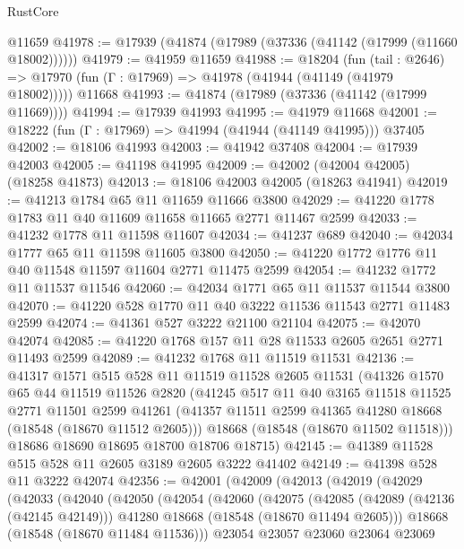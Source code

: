 \begin{lexlean}{RustCore}
\begin{coremodule}
    @11659
@41978 := @17939 (@41874 (@17989 (@37336 (@41142 (@17999 (@11660 @18002))))))
@41979 := @41959 @11659
@41988 := @18204
    (fun (tail : @2646) => @17970 (fun (Γ : @17969) => @41978 (@41944 (@41149 (@41979 @18002)))))
    @11668
@41993 := @41874 (@17989 (@37336 (@41142 (@17999 @11669))))
@41994 := @17939 @41993
@41995 := @41979 @11668
@42001 := @18222 (fun (Γ : @17969) => @41994 (@41944 (@41149 @41995))) @37405
@42002 := @18106 @41993
@42003 := @41942 @37408
@42004 := @17939 @42003
@42005 := @41198 @41995
@42009 := @42002 (@42004 @42005) (@18258 @41873)
@42013 := @18106 @42003 @42005 (@18263 @41941)
@42019 := @41213 @1784 @65 @11 @11659 @11666 @3800
@42029 := @41220 @1778 @1783 @11 @40 @11609 @11658 @11665 @2771 @11467 @2599
@42033 := @41232 @1778 @11 @11598 @11607
@42034 := @41237 @689
@42040 := @42034 @1777 @65 @11 @11598 @11605 @3800
@42050 := @41220 @1772 @1776 @11 @40 @11548 @11597 @11604 @2771 @11475 @2599
@42054 := @41232 @1772 @11 @11537 @11546
@42060 := @42034 @1771 @65 @11 @11537 @11544 @3800
@42070 := @41220 @528 @1770 @11 @40 @3222 @11536 @11543 @2771 @11483 @2599
@42074 := @41361 @527 @3222 @21100 @21104
@42075 := @42070 @42074
@42085 := @41220 @1768 @157 @11 @28 @11533 @2605 @2651 @2771 @11493 @2599
@42089 := @41232 @1768 @11 @11519 @11531
@42136 := @41317
    @1571
    @515
    @528
    @11
    @11519
    @11528
    @2605
    @11531
    (@41326
      @1570
      @65
      @44
      @11519
      @11526
      @2820
      (@41245
        @517
        @11
        @40
        @3165
        @11518
        @11525
        @2771
        @11501
        @2599
        @41261
        (@41357 @11511 @2599 @41365 @41280 @18668 (@18548 (@18670 @11512 @2605)))
        @18668
        (@18548 (@18670 @11502 @11518)))
      @18686
      @18690
      @18695
      @18700
      @18706
      @18715)
@42145 := @41389 @11528 @515 @528 @11 @2605 @3189 @2605 @3222 @41402
@42149 := @41398 @528 @11 @3222 @42074
@42356 := @42001
    (@42009
      (@42013
        (@42019
          (@42029
            (@42033
              (@42040
                (@42050
                  (@42054
                    (@42060
                      (@42075
                        (@42085
                          (@42089 (@42136 (@42145 @42149)))
                          @41280
                          @18668
                          (@18548 (@18670 @11494 @2605)))
                        @18668
                        (@18548 (@18670 @11484 @11536)))
                      @23054
                      @23057
                      @23060
                      @23064
                      @23069

\end{coremodule}
\end{lexlean}
